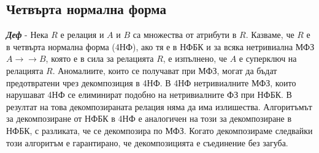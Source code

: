 \documentclass[fleqn,12pt]{article}
\begin{document}
\subsection{Четвърта нормална форма}

\textbf{\textit{Деф}} - Нека $R$ е релация и $A$ и $B$ са множества от атрибути в $R$. Казваме, че $R$ е в четвърта нормална форма (4НФ), ако тя е в НФБК и за всяка нетривиална МФЗ $A \rightarrow \rightarrow B$, която е в сила за релацията $R$, е изпълнено, че $A$ е суперключ на релацията $R$.
\bigbreak
Аномалиите, които се получават при МФЗ, могат да бъдат предотвратени чрез декомпозиция в 4НФ.
В 4НФ нетривиалните МФЗ, които нарушават 4НФ се елиминират подобно на нетривиалните ФЗ при НФБК.
В резултат на това декомпозираната релация няма да има излишества.
\bigbreak
Алгоритъмът за декомпозиране от НФБК в 4НФ е аналогичен на този за декомпозиране в НФБК, с разликата, че се декомпозира по МФЗ.
Когато декомпозираме следвайки този алгоритъм е гарантирано, че декомпозицията е съединение без загуба.
\end{document}
